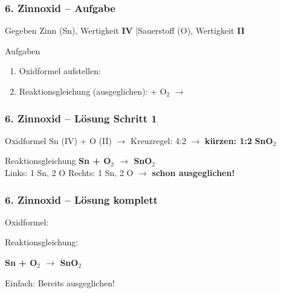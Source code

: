 \documentclass[aspectratio=169, 12pt]{beamer}
\newcommand{\lsg}[1]{\textcolor{loesung}{\textbf{#1}}}
\newcommand{\luecke}{\underline{\hspace{2.5cm}}}
\begin{document}

\begin{frame}
\frametitle{6. Zinnoxid – Aufgabe}
\begin{block}{Gegeben}
Zinn (Sn), Wertigkeit \textbf{IV} \quad|\quad Sauerstoff (O), Wertigkeit \textbf{II}
\end{block}
\vspace{0.5cm}
\begin{block}{Aufgaben}
\begin{enumerate}
\item Oxidformel aufstellen: \luecke
\item Reaktionsgleichung (ausgeglichen): \quad \luecke{} + O$_2$ $\rightarrow$ \luecke
\end{enumerate}
\end{block}
\end{frame}

\begin{frame}
\frametitle{6. Zinnoxid – Lösung Schritt 1}
\begin{block}{Oxidformel}
Sn (IV) + O (II) $\rightarrow$ Kreuzregel: 4:2 $\rightarrow$ \textbf{kürzen: 1:2} \hfill \lsg{SnO$_2$}
\end{block}
\vspace{0.3cm}
\begin{block}{Reaktionsgleichung}
\lsg{Sn + O$_2$ $\rightarrow$ SnO$_2$}\\[0.3cm]
Links: 1 Sn, 2 O \quad Rechts: 1 Sn, 2 O \quad $\rightarrow$ \textbf{schon ausgeglichen!}
\end{block}
\end{frame}

\begin{frame}
\frametitle{6. Zinnoxid – Lösung komplett}
\begin{center}
\vspace{0.5cm}
{\large Oxidformel:} \quad {\Huge \lsg{SnO$_2$}}
\vspace{1cm}

{\large Reaktionsgleichung:}
\vspace{0.5cm}

{\Huge \lsg{Sn + O$_2$ $\rightarrow$ SnO$_2$}}
\vspace{0.5cm}

{\small Einfach: Bereits ausgeglichen! \checkmark}
\end{center}
\end{frame}
\end{document}

